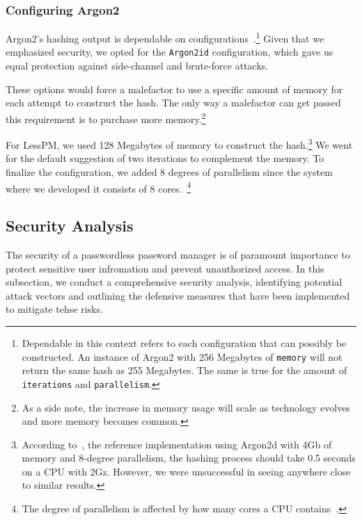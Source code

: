 \subsubsection{Configuring Argon2}
Argon2's hashing output is dependable on
configurations~\cite{argon2specs}.\footnote{
  Dependable in this context refers to each configuration that can
  possibly be constructed.
  An instance of Argon2 with 256 Megabytes of \texttt{memory} will not return
  the same hash as 255 Megabytes.
  The same is true for the amount of \texttt{iterations} and
  \texttt{parallelism}.
}
Given that we emphasized security, we opted for the \texttt{Argon2id}
configuration, which gave us equal protection against side-channel and
brute-force attacks.

These options would force a malefactor to use a specific amount of memory for
each attempt to construct the hash.
The only way a malefactor can get passed this requirement is to purchase more
memory.\footnote{
  As a side note, the increase in memory usage will scale as technology evolves
  and more memory becomes common.
}

For LessPM, we used 128 Megabytes of memory to construct the hash.\footnote{
  According to~\cite{argon2specs}, the reference implementation using Argon2d
  with 4Gb of memory and 8-degree parallelism, the hashing process should take
  0.5 seconds on a CPU with 2Gz. However, we were unsuccessful in seeing
  anywhere close to similar results.
}
We went for the default suggestion of two iterations to complement the memory.
To finalize the configuration, we added 8 degrees of parallelism since the
system where we developed it consists of 8 cores.~\footnote{
  The degree of parallelism is affected by how many cores a CPU
  contains~\cite{argon2specs}.
}


\subsection{Security Analysis}\label{subsec:security-analysis}
The security of a passwordless password manager is of paramount importance to
protect sensitive user infromation and prevent unauthorized access.
In this subsection, we conduct a comprehensive security analysis, identifying
  potential attack vectors and outlining the defensive measures that have
  been implemented to mitigate tehse risks.

